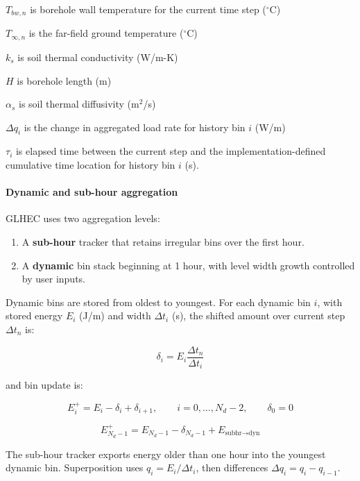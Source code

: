 \(T_{bw,n}\) is borehole wall temperature for the current time step (\(^\circ\)C)

\(T_{\infty,n}\) is the far-field ground temperature (\(^\circ\)C)

\(k_s\) is soil thermal conductivity (W/m-K)

\(H\) is borehole length (m)

\(\alpha_s\) is soil thermal diffusivity (m\(^2\)/s)

\(\Delta q_i\) is the change in aggregated load rate for history bin \(i\) (W/m)

\(\tau_i\) is elapsed time between the current step and the implementation-defined cumulative time location for history bin \(i\) (s).

\paragraph{Dynamic and sub-hour aggregation}\label{dynamic-and-sub-hour-aggregation}

GLHEC uses two aggregation levels:

\begin{enumerate}
\item A \textbf{sub-hour} tracker that retains irregular bins over the first hour.
\item A \textbf{dynamic} bin stack beginning at 1 hour, with level width growth controlled by user inputs.
\end{enumerate}

Dynamic bins are stored from oldest to youngest. For each dynamic bin \(i\), with stored energy \(E_i\) (J/m) and width \(\Delta t_i\) (s), the shifted amount over current step \(\Delta t_n\) is:

\begin{equation}
\delta_i = E_i \frac{\Delta t_n}{\Delta t_i}
\end{equation}

and bin update is:

\begin{equation}
E_i^{+} = E_i - \delta_i + \delta_{i+1}, \qquad i=0,\ldots,N_d-2,\qquad \delta_0 = 0
\end{equation}

\begin{equation}
E_{N_d-1}^{+} = E_{N_d-1} - \delta_{N_d-1} + E_{\text{subhr}\rightarrow\text{dyn}}
\end{equation}

The sub-hour tracker exports energy older than one hour into the youngest dynamic bin. Superposition uses \(q_i = E_i/\Delta t_i\), then differences \(\Delta q_i = q_i - q_{i-1}\).

